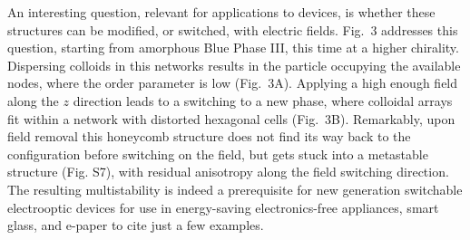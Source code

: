\documentclass[12pt]{article}
\begin{document}
An interesting question, relevant for applications to devices, is whether 
these structures can be modified, or switched, with electric fields.
Fig.~3 addresses this question, starting from amorphous Blue Phase III,
this time at a higher chirality. Dispersing colloids in this networks
results in the particle occupying the available nodes, where the order
parameter is low (Fig.~3A). Applying a high enough field along the $z$ 
direction leads to a switching to a new phase, where colloidal arrays fit 
within a network with distorted hexagonal cells (Fig.~3B). Remarkably, upon 
field removal this honeycomb structure does not find its way back to the 
configuration before switching on the field, but gets stuck into a metastable 
structure (Fig. S7), with residual anisotropy along the field switching 
direction.
The resulting multistability is indeed a prerequisite for new generation 
switchable electrooptic devices for use in energy-saving electronics-free
appliances, smart glass, and e-paper to cite just a few examples.

\fi
\end{document}

